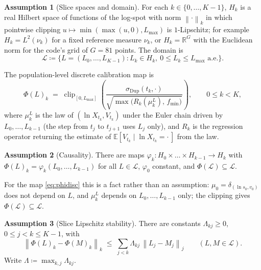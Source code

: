 \documentclass[11pt,a4paper]{article}
\theoremstyle{plain}
\theoremstyle{definition}
\newtheorem{assumption}{Assumption}
\theoremstyle{definition}
\newcommand{\E}{\mathbb{E}}
\newcommand{\R}{\mathbb{R}}
\newcommand{\norm}[1]{\left\lVert #1 \right\rVert}
\newcommand{\sigDup}{\sigma_{\mathrm{Dup}}}
\newcommand{\Lev}{L}
\newcommand{\Phimap}{\Phi}
\newcommand{\Lset}{\mathcal{L}}
\newcommand{\Lmax}{L_{\max}}
\newcommand{\fmin}{f_{\min}}
\DeclareMathOperator{\clip}{clip}
\begin{document}
\begin{assumption}[Slice spaces and domain]\label{ass:A0}
For each $k \in \{0, \dots, K-1\}$, $H_k$ is a real Hilbert space of functions of the log-spot with norm $\norm{\cdot}_k$ in which pointwise clipping $u \mapsto \min(\max(u, 0), \Lmax)$ is $1$-Lipschitz; for example $H_k = L^2(\nu_k)$ for a fixed reference measure $\nu_k$, or $H_k = \R^{G}$ with the Euclidean norm for the code's grid of $G = 81$ points. The domain is
\[
  \Lset \coloneqq \bigl\{ \Lev = (\Lev_0, \dots, \Lev_{K-1}) : \Lev_k \in H_k,\ 0 \le \Lev_k \le \Lmax \text{ a.e.} \bigr\}.
\]
\end{assumption}

The population-level discrete calibration map is
\begin{equation}\label{eq:phidisc}
  \Phimap(\Lev)_k \;=\; \clip_{[0, \Lmax]}\!\left( \frac{\sigDup(t_k, \cdot)}{\sqrt{\max\bigl( R_k(\mu^{\Lev}_k),\, \fmin \bigr)}} \right), \qquad 0 \le k < K,
\end{equation}
where $\mu^{\Lev}_k$ is the law of $(\ln X_{t_k}, V_{t_k})$ under the Euler chain driven by $\Lev_0, \dots, \Lev_{k-1}$ (the step from $t_j$ to $t_{j+1}$ uses $\Lev_j$ only), and $R_k$ is the regression operator returning the estimate of $\E[V_{t_k} \mid \ln X_{t_k} = \cdot\,]$ from the law.

\begin{assumption}[Causality]\label{ass:A2}
There are maps $\varphi_k \colon H_0 \times \dots \times H_{k-1} \to H_k$ with $\Phimap(\Lev)_k = \varphi_k(\Lev_0, \dots, \Lev_{k-1})$ for all $\Lev \in \Lset$, $\varphi_0$ constant, and $\Phimap(\Lset) \subseteq \Lset$.
\end{assumption}

For the map \cref{eq:phidisc} this is a fact rather than an assumption: $\mu_0 = \delta_{(\ln s_0, v_0)}$ does not depend on $\Lev$, and $\mu^{\Lev}_k$ depends on $\Lev_0, \dots, \Lev_{k-1}$ only; the clipping gives $\Phimap(\Lset) \subseteq \Lset$.

\begin{assumption}[Slice Lipschitz stability]\label{ass:A3}
There are constants $\Lambda_{kj} \ge 0$, $0 \le j < k \le K-1$, with
\[
  \norm{\Phimap(\Lev)_k - \Phimap(M)_k}_k \;\le\; \sum_{j < k} \Lambda_{kj}\, \norm{\Lev_j - M_j}_j \qquad (\Lev, M \in \Lset).
\]
Write $\Lambda \coloneqq \max_{k, j} \Lambda_{kj}$.
\end{assumption}
\end{document}
